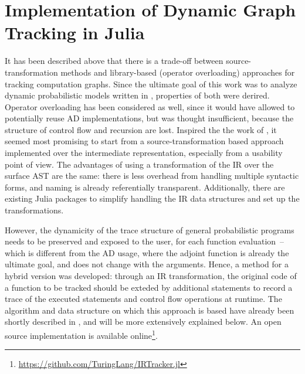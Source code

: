 \chapter{Implementation of Dynamic Graph Tracking in Julia}
\label{cha:impl-dynam-graph}

It has been described above that there is a trade-off between source-transformation methods and
library-based (operator overloading) approaches for tracking computation graphs.  Since the ultimate
goal of this work was to analyze dynamic probabilistic models written in \turingjl{}, properties of
both were derired.  Operator overloading has been considered as well, since it would have allowed to
potentially reuse AD implementations, but was thought insufficient, because the structure of control
flow and recursion are lost.  Inspired the the work of \textcite{innes2018don}, it seemed most
promising to start from a source-transformation based approach implemented over the intermediate
representation, especially from a usability point of view.  The advantages of using a transformation
of the IR over the surface AST are the same: there is less overhead from handling multiple syntactic
forms, and naming is already referentially transparent.  Additionally, there are existing Julia
packages to simplify handling the IR data structures and set up the transformations.

However, the dynamicity of the trace structure of general probabilistic programs needs to be
preserved and exposed to the user, for each function evaluation~-- which is different from the AD
usage, where the adjoint function is already the ultimate goal, and does not change with the
arguments.  Hence, a method for a hybrid version was developed: through an IR transformation, the
original code of a function to be tracked should be exteded by additional statements to record a
trace of the executed statements and control flow operations at runtime.  The algorithm and data
structure on which this approach is based have already been shortly described in
\textcite{gabler2019graph}, and will be more extensively explained below.  An open source
implementation is available
online\footnote{\protect\url{https://github.com/TuringLang/IRTracker.jl}}.

